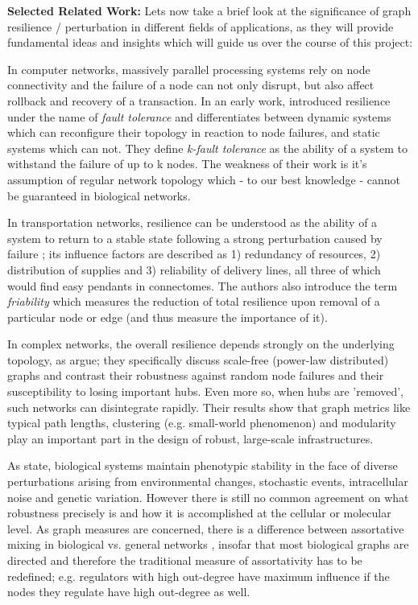 \documentclass[a4paper,11pt]{article}
\begin{document}
\textbf{Selected Related Work:} Lets now take a brief look at the significance of graph resilience / perturbation in different fields of applications, as they will provide fundamental ideas and insights which will guide us over the course of this project:

In computer networks, massively parallel processing systems rely on node connectivity and the failure of a node can not only disrupt, but also affect rollback and recovery of a transaction. In an early work, \citep{Gaudiot1990NetworkResilience} introduced resilience under the name of \emph{fault tolerance} and differentiates between dynamic systems which can reconfigure their topology in reaction to node failures, and static systems which can not. They define \emph{k-fault tolerance} as the ability of a system to withstand the failure of up to k nodes. The weakness of their work is it's assumption of regular network topology which - to our best knowledge - cannot be guaranteed in biological networks.

In transportation networks, resilience can be understood as the ability of a system to return to a stable state following a strong perturbation caused by failure \citep{Ip2011ResilienceTransportationNetworks}; its influence factors are described as 1) redundancy of resources, 2) distribution of supplies and 3) reliability of delivery lines, all three of which would find easy pendants in connectomes. The authors also introduce the term \emph{friability} which measures the reduction of total resilience upon removal of a particular node or edge (and thus measure the importance of it).

In complex networks, the overall resilience depends strongly on the underlying topology, as  \citep{Ash2007CascadingFailures} argue; they specifically discuss scale-free (power-law distributed) graphs and contrast their robustness against random node failures and their susceptibility to losing important hubs. Even more so, when hubs are 'removed', such networks can disintegrate rapidly. Their results show that graph metrics like typical path lengths, clustering (e.g. small-world phenomenon) and modularity play an important part in the design of robust, large-scale infrastructures.

As \citep{Sauer2004CellularFunction} state, biological systems maintain phenotypic stability in the face of diverse perturbations arising from environmental changes, stochastic events, intracellular noise and genetic variation. However there is still no common agreement on what robustness precisely is and how it is accomplished at the cellular or molecular level. As graph measures are concerned, there is a difference between assortative mixing in biological vs. general networks \citep{Piraveenan2012AssortativeMixing}, insofar that most biological graphs are directed and therefore the traditional measure of assortativity has to be redefined; e.g. regulators with high out-degree have maximum influence if the nodes they regulate have high out-degree as well.
\end{document}
